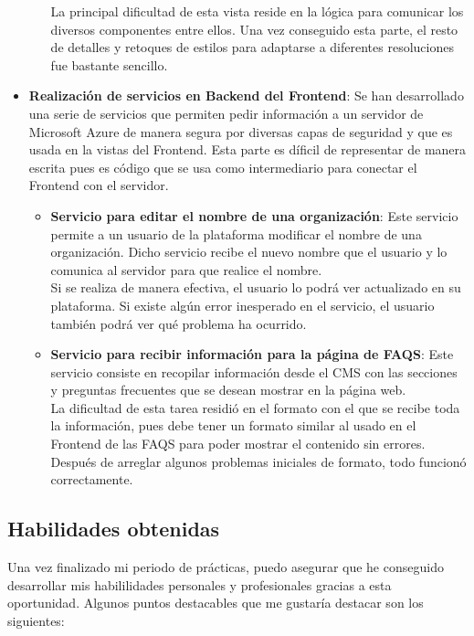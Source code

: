 \documentclass[a4paper,12pt]{article}
\begin{document}
\begin{itemize}
\begin{itemize}
        La principal dificultad de esta vista reside en la lógica para comunicar los diversos componentes entre ellos. Una vez conseguido esta parte, el resto de detalles y retoques de estilos para adaptarse a diferentes resoluciones fue bastante sencillo.
        
    \end{itemize}
    
    \item \textbf{Realización de servicios en Backend del Frontend}: Se han desarrollado una serie de servicios que permiten pedir información a un servidor de Microsoft Azure de manera segura por diversas capas de seguridad y que es usada en la vistas del Frontend. Esta parte es díficil de representar de manera escrita pues es código que se usa como intermediario para conectar el Frontend con el servidor.
    \begin{itemize}
        \item \textbf{Servicio para editar el nombre de una organización}: Este servicio permite a un usuario de la plataforma modificar el nombre de una organización. Dicho servicio recibe el nuevo nombre que el usuario y lo comunica al servidor para que realice el nombre. \\
        Si se realiza de manera efectiva, el usuario lo podrá ver actualizado en su plataforma. Si existe algún error inesperado en el servicio, el usuario también podrá ver qué problema ha ocurrido.
        
        \item \textbf{Servicio para recibir información para la página de FAQS}: Este servicio consiste en recopilar información desde el CMS con las secciones y preguntas frecuentes que se desean mostrar en la página web.\\
        La dificultad de esta tarea residió en el formato con el que se recibe toda la información, pues debe tener un formato similar al usado en el Frontend de las FAQS para poder mostrar el contenido sin errores. Después de arreglar algunos problemas iniciales de formato, todo funcionó correctamente.
        
    \end{itemize}
\end{itemize}

\subsection{Habilidades obtenidas}

Una vez finalizado mi periodo de prácticas, puedo asegurar que he conseguido desarrollar mis habililidades personales y profesionales gracias a esta oportunidad. Algunos puntos destacables que me gustaría destacar son los siguientes:
\end{document}
